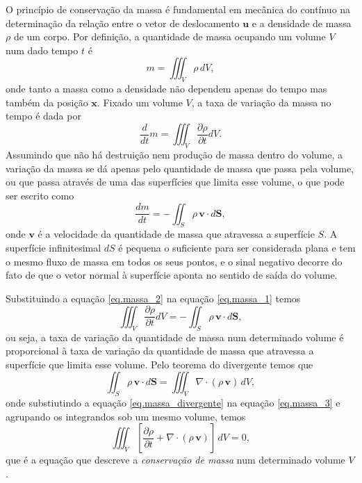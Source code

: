 O princ\'ipio de conserva\c{c}\~ao da massa \'e fundamental em mec\^anica do cont\'inuo na determina\c{c}\~ao da rela\c{c}\~ao entre o vetor de deslocamento $\mathbf{u}$ e a densidade de massa $\rho$ de um corpo. Por defini\c{c}\~ao, a quantidade de massa ocupando um volume $V$  num dado tempo $t$ \'e
\begin{equation*}
m=\iiint_V\rho\,dV,
\end{equation*}
onde tanto a massa como a densidade n\~ao dependem apenas do tempo mas tamb\'em da posi\c{c}\~ao $\mathbf{x}$. Fixado um volume $V$, a taxa de varia\c{c}\~ao da massa no tempo \'e dada por
\begin{equation}\label{eq.massa_1}
\frac{d}{dt}m=\iiint_V\frac{\partial\rho}{\partial t}dV.
\end{equation}
Assumindo que n\~ao h\'a destrui\c{c}\~ao nem produ\c{c}\~ao de massa dentro do volume, a varia\c{c}\~ao da massa se d\'a apenas pelo quantidade de massa que passa pela volume, ou que passa atrav\'es de uma das superf\'icies que limita esse volume, o que pode ser escrito como
\begin{equation}\label{eq.massa_2}
\frac{dm}{dt}=-\iint_S\rho\,\mathbf{v}\cdot d\mathbf{S},
\end{equation}
onde $\mathbf{v}$ \'e a velocidade da quantidade de massa que atravessa a superf\'icie $S$. A superf\'icie infinitesimal $dS$ \'e pequena o suficiente para ser considerada plana e tem o mesmo fluxo de massa em todos os seus pontos, e o sinal negativo decorre do fato de que o vetor normal \`a superf\'icie aponta no sentido de sa\'ida do volume. 

Substituindo a equa\c{c}\~ao \ref{eq.massa_2} na equa\c{c}\~ao \ref{eq.massa_1} temos
\begin{equation}\label{eq.massa_3}
\iiint_V\frac{\partial\rho}{\partial t}dV=-\iint_S\rho\,\mathbf{v}\cdot d\mathbf{S},
\end{equation}
ou seja, a taxa de varia\c{c}\~ao da quantidade de massa num determinado volume \'e proporcional \`a taxa de varia\c{c}\~ao da quantidade de massa que atravessa a superf\'icie que limita esse volume. Pelo teorema do divergente temos que
\begin{equation}\label{eq.massa_divergente}
\iint_S\rho\,\mathbf{v}\cdot d\mathbf{S}=\iiint_V\nabla\cdot (\rho\,\mathbf{v})\,dV,
\end{equation}
onde substiutindo a equa\c{c}\~ao \ref{eq.massa_divergente} na equa\c{c}\~ao \ref{eq.massa_3} e agrupando os integrandos sob um mesmo volume, temos
\begin{equation*}
\iiint_V\left[\frac{\partial\rho}{\partial t}+\nabla\cdot (\rho\,\mathbf{v})\right]\,dV=0,
\end{equation*}
que \'e a equa\c{c}\~ao que descreve a \textit{conserva\c{c}\~ao de massa} num determinado volume $V$.


